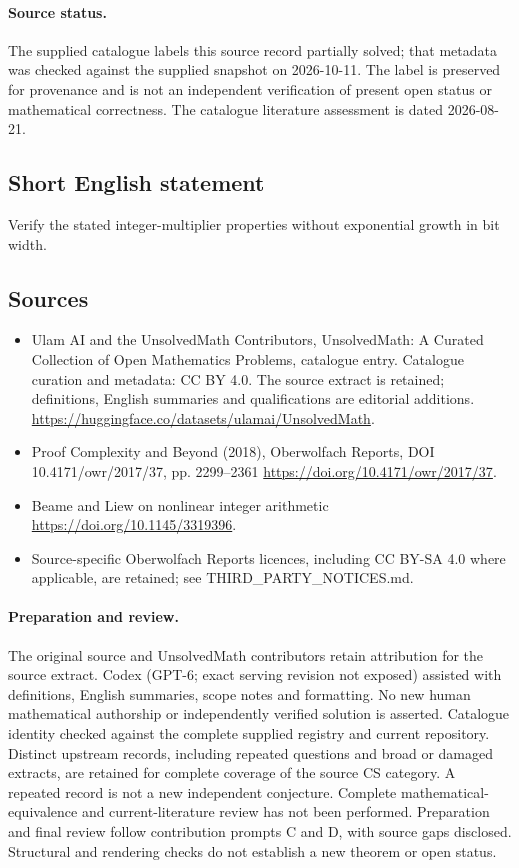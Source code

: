\documentclass[11pt]{article}
\begin{document}
\paragraph{Source status.}
The supplied catalogue labels this source record partially solved; that metadata was checked against the supplied snapshot on 2026-10-11. The label is preserved for provenance and is not an independent verification of present open status or mathematical correctness. The catalogue literature assessment is dated 2026-08-21.
\subsection{Short English statement}
Verify the stated integer-multiplier properties without exponential growth in bit width.
\subsection{Sources}
\begin{itemize}
\item[S1] Ulam AI and the UnsolvedMath Contributors, UnsolvedMath: A Curated Collection of Open Mathematics Problems, catalogue entry. Catalogue curation and metadata: CC BY 4.0. The source extract is retained; definitions, English summaries and qualifications are editorial additions.
\url{https://huggingface.co/datasets/ulamai/UnsolvedMath}.
\item[S2] Proof Complexity and Beyond (2018), Oberwolfach Reports, DOI 10.4171/owr/2017/37, pp. 2299--2361
\url{https://doi.org/10.4171/owr/2017/37}.
\item[S3] Beame and Liew on nonlinear integer arithmetic
\url{https://doi.org/10.1145/3319396}.
\item Source-specific Oberwolfach Reports licences, including CC BY-SA 4.0 where applicable, are retained; see THIRD\_PARTY\_NOTICES.md.
\end{itemize}
\paragraph{Preparation and review.}
The original source and UnsolvedMath contributors retain attribution for the source extract. Codex (GPT-6; exact serving revision not exposed) assisted with definitions, English summaries, scope notes and formatting. No new human mathematical authorship or independently verified solution is asserted. Catalogue identity checked against the complete supplied registry and current repository. Distinct upstream records, including repeated questions and broad or damaged extracts, are retained for complete coverage of the source CS category. A repeated record is not a new independent conjecture. Complete mathematical-equivalence and current-literature review has not been performed. Preparation and final review follow contribution prompts C and D, with source gaps disclosed. Structural and rendering checks do not establish a new theorem or open status.
\label{end:statement}
\end{document}
